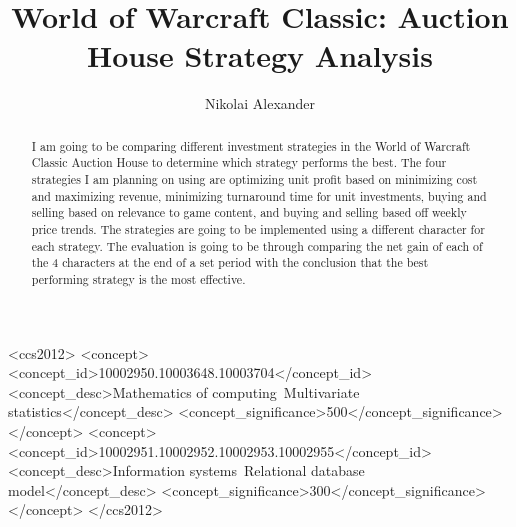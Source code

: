 \documentclass[sigconf]{acmart}
\begin{document}
%
\title{World of Warcraft Classic: Auction House Strategy Analysis}

%
\author{Nikolai Alexander}

%
\renewcommand{\shortauthors}{Alexander}

%
\begin{abstract}
I am going to be comparing different investment strategies in the World of Warcraft Classic Auction House to determine which strategy performs the best. The four strategies I am planning on using are optimizing unit profit based on minimizing cost and maximizing revenue, minimizing turnaround time for unit investments, buying and selling based on relevance to game content, and buying and selling based off weekly price trends. The strategies are going to be implemented using a different character for each strategy. The evaluation is going to be through comparing the net gain of each of the 4 characters at the end of a set period with the conclusion that the best performing strategy is the most effective.
\end{abstract}

%
%
\begin{CCSXML}
<ccs2012>
<concept>
<concept_id>10002950.10003648.10003704</concept_id>
<concept_desc>Mathematics of computing~Multivariate statistics</concept_desc>
<concept_significance>500</concept_significance>
</concept>
<concept>
<concept_id>10002951.10002952.10002953.10002955</concept_id>
<concept_desc>Information systems~Relational database model</concept_desc>
<concept_significance>300</concept_significance>
</concept>
</ccs2012>
\end{CCSXML}
\end{document}
